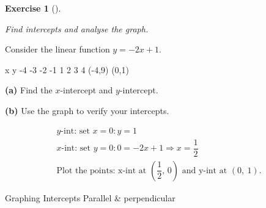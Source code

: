 \documentclass[
  letterpaper,
  DIV=11,
  numbers=noendperiod]{scrreprt}
\theoremstyle{definition}
\newtheorem{exercise}{Exercise}[chapter]
\theoremstyle{remark}
\begin{document}
\begin{exercise}[]\protect\hypertarget{exr-u7-13}{}\label{exr-u7-13}

\emph{Find intercepts and analyse the graph.}

Consider the linear function \(y = -2x + 1\).

x y -4 -3 -2 -1 1 2 3 4 (-4,9) (0,1)

\textbf{(a)} Find the \(x\)-intercept and \(y\)-intercept.

\textbf{(b)} Use the graph to verify your intercepts.

\begin{tcolorbox}[enhanced jigsaw, opacitybacktitle=0.6, coltitle=black, arc=.35mm, colframe=quarto-callout-tip-color-frame, colback=white, bottomrule=.15mm, left=2mm, colbacktitle=quarto-callout-tip-color!10!white, titlerule=0mm, opacityback=0, title=\textcolor{quarto-callout-tip-color}{\faLightbulb}\hspace{0.5em}{🔍 View Solution}, leftrule=.75mm, breakable, rightrule=.15mm, bottomtitle=1mm, toptitle=1mm, toprule=.15mm]

\[
\begin{aligned}
y\text{-int: set }x=0: y = 1 \\[4pt] x\text{-int: set }y=0: 0 = -2x + 1 \Rightarrow x = \dfrac{1}{2} \\[4pt] \text{Plot the points: x-int at }(\dfrac{1}{2},\, 0)\text{ and y-int at }(0,\ 1).
\end{aligned}
\]

\end{tcolorbox}

{Graphing} {Intercepts} {Parallel \& perpendicular}

\end{exercise}
\end{document}
